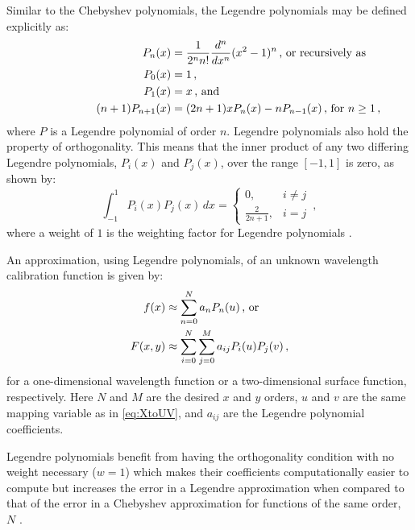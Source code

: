 Similar to the Chebyshev polynomials, the Legendre polynomials may be defined explicitly as:
\begin{align} \label{eq:legpolyexplicit}
    P_{n}(x) &= \frac{1}{2^{n} n!} \frac{d^{n}}{d x^{n}} (x^{2} - 1)^{n} \rlap{\,,\ or recursively as}\\
    P_{0}(x) &= 1 \,,\notag\\
    P_{1}(x) &= x \rlap{\,,\ and} \label{eq:legpoly}\\
    (n+1)P_{n+1}(x) &= (2n+1)xP_n(x) - nP_{n-1}(x) \rlap{\,,\ for $n \geq 1$\,,}\notag
\end{align}
where $P$ is a Legendre polynomial of order $n$. Legendre polynomials also hold the property of orthogonality. This means that the inner product of any two differing Legendre polynomials, $P_{i}(x)$ and $P_{j}(x)$, over the range $[-1, 1]$ is zero, as shown by:
\begin{equation} \label{eq:legorth}
    \int_{-1}^{1} P_{i}(x) P_{j}(x) \,dx =
    \begin{cases}
        0,                 & i \neq j \\
        \frac{2}{2 n + 1}, & i = j
    \end{cases}\,,
\end{equation}
where a weight of $1$ is the weighting factor for Legendre polynomials \citep{numerical_recipes, leg}.

An approximation, using Legendre polynomials, of an unknown wavelength calibration function is given by:
\begin{align} \label{eq:legendre}
    f(x) &\approx \sum_{n = 0}^{N} a_{n} P_{n}(u) \rlap{\,,\ or}\\
    F(x, y) &\approx \sum_{i = 0}^{N} \sum_{j = 0}^{M} a_{ij} P_{i}(u) P_{j}(v)\,,\label{eq:Legendre2D}
\end{align}
for a one-dimensional wavelength function or a two-dimensional surface function, respectively. Here $N$ and $M$ are the desired $x$ and $y$ orders, $u$ and $v$ are the same mapping variable as in \autoref{eq:XtoUV}, and $a_{ij}$ are the Legendre polynomial coefficients.

Legendre polynomials benefit from having the orthogonality condition with no weight necessary ($w = 1$) which makes their coefficients computationally easier to compute but increases the error in a Legendre approximation when compared to that of the error in a Chebyshev approximation for functions of the same order, $N$ \citep{leg_cheb_relation}.

